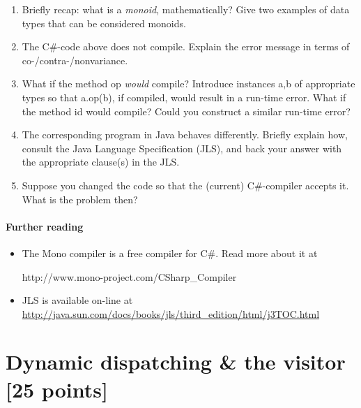\documentclass{article}
\begin{document}
\begin{enumerate}
\item Briefly recap: what is a \textit{monoid}, mathematically? Give two examples
of data types that can be considered monoids.
\item The C\#-code above does not compile. Explain the error message
in terms of co-/contra-/nonvariance.
\item What if the method \textsf{op} \textit{would} compile? 
Introduce instances \textsf{a,b} of appropriate types so that
\textsf{a.op(b)}, if compiled, would result in a run-time error.
What if the method 
\textsf{id} would compile? Could you construct a similar run-time
error? 
%
\item The corresponding program in Java behaves differently. Briefly
explain how, consult the Java Language Specification (JLS), and back your answer
with the appropriate clause(s) in the JLS.
\item Suppose you changed the code so that 
the (current) C\#-compiler accepts it. What is the problem then? 
\end{enumerate}

\paragraph{Further reading}
\begin{itemize}
\item The Mono compiler is a free compiler for C\#. Read more about it
at

\textsf{http://www.mono-project.com/CSharp\_Compiler}

\item JLS is available on-line 
 at 
\url{http://java.sun.com/docs/books/jls/third_edition/html/j3TOC.html}

\end{itemize}

\newpage
\section{Dynamic dispatching \& the visitor [25 points]}
\end{document}
